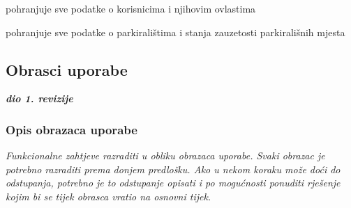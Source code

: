                 \begin{packed_enum}
				\item  {}
				
				\begin{packed_enum}
					
					
					\item pohranjuje sve podatke o korisnicima i njihovim ovlastima
					\item pohranjuje sve podatke o parkiralištima i stanja zauzetosti parkirališnih mjesta
					
					
				\end{packed_enum}
                \end{packed_enum}
			
			\eject 
			
			
				
			\subsection{Obrasci uporabe}
				
				\textbf{\textit{dio 1. revizije}}
				
				\subsubsection{Opis obrazaca uporabe}

					\textit{Funkcionalne zahtjeve razraditi u obliku obrazaca uporabe. Svaki obrazac je potrebno razraditi prema donjem predlošku. Ako u nekom koraku može doći do odstupanja, potrebno je to odstupanje opisati i po mogućnosti ponuditi rješenje kojim bi se tijek obrasca vratio na osnovni tijek.}\\
					

